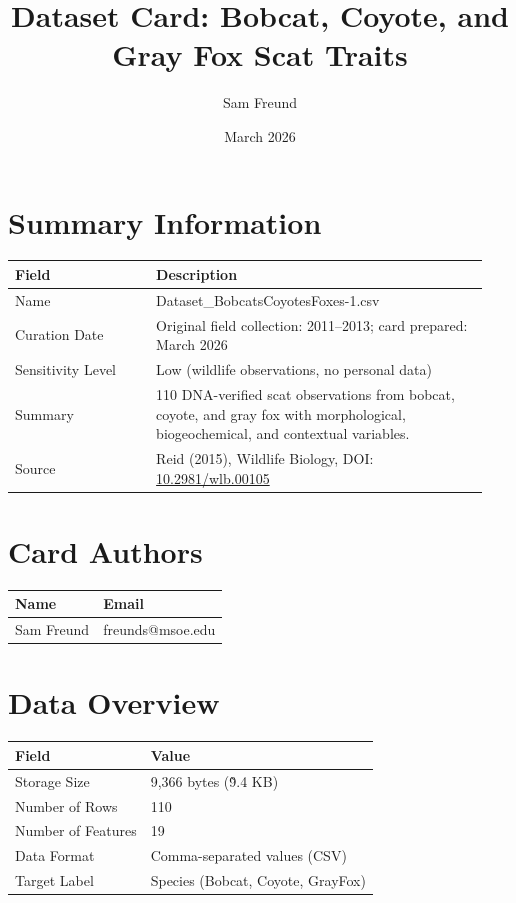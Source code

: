 \documentclass[11pt,a4paper]{article}
\title{Dataset Card: Bobcat, Coyote, and Gray Fox Scat Traits}
\author{Sam Freund}
\date{March 2026}
\begin{document}
\maketitle

\section*{Summary Information}
\begin{tabular}{@{}p{0.28\linewidth}p{0.66\linewidth}@{}}
\toprule
\textbf{Field} & \textbf{Description} \\
\midrule
Name & Dataset\_BobcatsCoyotesFoxes-1.csv \\
Curation Date & Original field collection: 2011--2013; card prepared: March 2026 \\
Sensitivity Level & Low (wildlife observations, no personal data) \\
Summary & 110 DNA-verified scat observations from bobcat, coyote, and gray fox with morphological, biogeochemical, and contextual variables. \\
Source & Reid (2015), Wildlife Biology, DOI: \href{https://doi.org/10.2981/wlb.00105}{10.2981/wlb.00105} \\
\bottomrule
\end{tabular}

\section*{Card Authors}
\begin{tabular}{@{}ll@{}}
\toprule
\textbf{Name} & \textbf{Email} \\
\midrule
Sam Freund & freunds@msoe.edu \\
\bottomrule
\end{tabular}

\section*{Data Overview}
\begin{tabular}{@{}ll@{}}
\toprule
\textbf{Field} & \textbf{Value} \\
\midrule
Storage Size & 9,366 bytes (\~9.4 KB) \\
Number of Rows & 110 \\
Number of Features & 19 \\
Data Format & Comma-separated values (CSV) \\
Target Label & Species (Bobcat, Coyote, GrayFox) \\
\bottomrule
\end{tabular}
\end{document}
